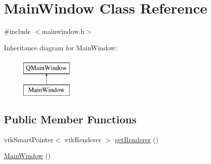 \hypertarget{class_main_window}{}\section{Main\+Window Class Reference}
\label{class_main_window}


{\ttfamily \#include $<$mainwindow.\+h$>$}

Inheritance diagram for Main\+Window\+:\begin{figure}[H]
\begin{center}
\leavevmode
\includegraphics[height=2.000000cm]{class_main_window}
\end{center}
\end{figure}
\subsection*{Public Member Functions}
\begin{DoxyCompactItemize}
\item 
vtk\+Smart\+Pointer$<$ vtk\+Renderer $>$ \hyperlink{class_main_window_a2fb384b2232488ced24aad4237e0290e}{get\+Renderer} ()
\item 
\hyperlink{class_main_window_a34c4b4207b46d11a4100c9b19f0e81bb}{Main\+Window} ()
\end{DoxyCompactItemize}
